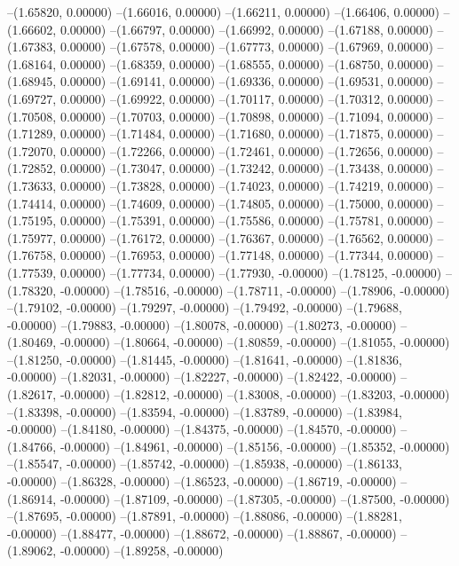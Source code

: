 --(1.65820, 0.00000)
--(1.66016, 0.00000)
--(1.66211, 0.00000)
--(1.66406, 0.00000)
--(1.66602, 0.00000)
--(1.66797, 0.00000)
--(1.66992, 0.00000)
--(1.67188, 0.00000)
--(1.67383, 0.00000)
--(1.67578, 0.00000)
--(1.67773, 0.00000)
--(1.67969, 0.00000)
--(1.68164, 0.00000)
--(1.68359, 0.00000)
--(1.68555, 0.00000)
--(1.68750, 0.00000)
--(1.68945, 0.00000)
--(1.69141, 0.00000)
--(1.69336, 0.00000)
--(1.69531, 0.00000)
--(1.69727, 0.00000)
--(1.69922, 0.00000)
--(1.70117, 0.00000)
--(1.70312, 0.00000)
--(1.70508, 0.00000)
--(1.70703, 0.00000)
--(1.70898, 0.00000)
--(1.71094, 0.00000)
--(1.71289, 0.00000)
--(1.71484, 0.00000)
--(1.71680, 0.00000)
--(1.71875, 0.00000)
--(1.72070, 0.00000)
--(1.72266, 0.00000)
--(1.72461, 0.00000)
--(1.72656, 0.00000)
--(1.72852, 0.00000)
--(1.73047, 0.00000)
--(1.73242, 0.00000)
--(1.73438, 0.00000)
--(1.73633, 0.00000)
--(1.73828, 0.00000)
--(1.74023, 0.00000)
--(1.74219, 0.00000)
--(1.74414, 0.00000)
--(1.74609, 0.00000)
--(1.74805, 0.00000)
--(1.75000, 0.00000)
--(1.75195, 0.00000)
--(1.75391, 0.00000)
--(1.75586, 0.00000)
--(1.75781, 0.00000)
--(1.75977, 0.00000)
--(1.76172, 0.00000)
--(1.76367, 0.00000)
--(1.76562, 0.00000)
--(1.76758, 0.00000)
--(1.76953, 0.00000)
--(1.77148, 0.00000)
--(1.77344, 0.00000)
--(1.77539, 0.00000)
--(1.77734, 0.00000)
--(1.77930, -0.00000)
--(1.78125, -0.00000)
--(1.78320, -0.00000)
--(1.78516, -0.00000)
--(1.78711, -0.00000)
--(1.78906, -0.00000)
--(1.79102, -0.00000)
--(1.79297, -0.00000)
--(1.79492, -0.00000)
--(1.79688, -0.00000)
--(1.79883, -0.00000)
--(1.80078, -0.00000)
--(1.80273, -0.00000)
--(1.80469, -0.00000)
--(1.80664, -0.00000)
--(1.80859, -0.00000)
--(1.81055, -0.00000)
--(1.81250, -0.00000)
--(1.81445, -0.00000)
--(1.81641, -0.00000)
--(1.81836, -0.00000)
--(1.82031, -0.00000)
--(1.82227, -0.00000)
--(1.82422, -0.00000)
--(1.82617, -0.00000)
--(1.82812, -0.00000)
--(1.83008, -0.00000)
--(1.83203, -0.00000)
--(1.83398, -0.00000)
--(1.83594, -0.00000)
--(1.83789, -0.00000)
--(1.83984, -0.00000)
--(1.84180, -0.00000)
--(1.84375, -0.00000)
--(1.84570, -0.00000)
--(1.84766, -0.00000)
--(1.84961, -0.00000)
--(1.85156, -0.00000)
--(1.85352, -0.00000)
--(1.85547, -0.00000)
--(1.85742, -0.00000)
--(1.85938, -0.00000)
--(1.86133, -0.00000)
--(1.86328, -0.00000)
--(1.86523, -0.00000)
--(1.86719, -0.00000)
--(1.86914, -0.00000)
--(1.87109, -0.00000)
--(1.87305, -0.00000)
--(1.87500, -0.00000)
--(1.87695, -0.00000)
--(1.87891, -0.00000)
--(1.88086, -0.00000)
--(1.88281, -0.00000)
--(1.88477, -0.00000)
--(1.88672, -0.00000)
--(1.88867, -0.00000)
--(1.89062, -0.00000)
--(1.89258, -0.00000)
